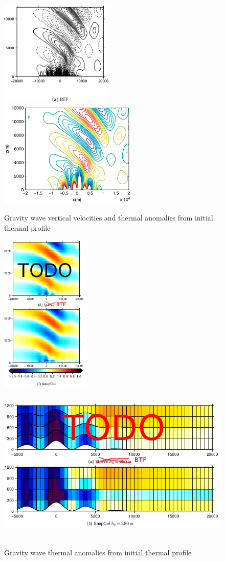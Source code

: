 \documentclass[a4paper]{article}
\begin{document}
\begin{figure}
	\includegraphics[height=2in]{gw-w-btf.png}
	\includegraphics[height=2in]{melvin-7a.png}
%
	\caption{Gravity wave vertical velocities and thermal anomalies from initial thermal profile}
	\label{fig:gw-w}
\end{figure}

\begin{figure}
	\includegraphics[height=3in]{gw-theta.png}
	\includegraphics[height=3in]{gw-theta-zoom.png}
%
	\caption{Gravity wave thermal anomalies from initial thermal profile}
	\label{fig:gw-theta}
\end{figure}
\end{document}
